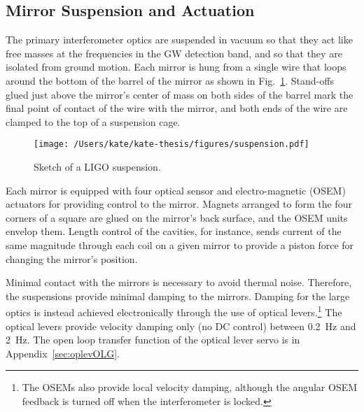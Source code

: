 \subsection{Mirror Suspension and Actuation}
\label{sec:suspension}
The primary interferometer optics are suspended in vacuum so that they
act like free masses at the frequencies in the GW detection band, and
so that they are isolated from ground motion. Each mirror is hung from
a single wire that loops around the bottom of the barrel of the mirror
as shown in Fig.~\ref{fig:suspension}. Stand-offs glued just above the
mirror's center of mass on both sides of the barrel mark the final
point of contact of the wire with the mirror, and both ends of the
wire are clamped to the top of a suspension cage.

\begin{figure}
\begin{centering}
\texttt{[image: /Users/kate/kate-thesis/figures/suspension.pdf]}
\caption[Sketch of a LIGO suspension]{Sketch of a LIGO suspension.}
\label{fig:suspension}
\end{centering}
\end{figure}

Each mirror is equipped with four optical sensor and electro-magnetic
(OSEM) actuators for providing control to the mirror. Magnets arranged
to form the four corners of a square are glued on the mirror's back
surface, and the OSEM units envelop them. Length control of the
cavities, for instance, sends current of the same magnitude through
each coil on a given mirror to provide a piston force for changing the
mirror's position.

Minimal contact with the mirrors is necessary to avoid thermal
noise. Therefore, the suspensions provide minimal damping to the
mirrors. Damping for the large optics is instead achieved
electronically through the use of optical levers.\footnote{The OSEMs
  also provide local velocity damping, although the angular OSEM
  feedback is turned off when the interferometer is locked.} The
optical levers provide velocity damping only (no DC control) between
0.2~Hz and 2~Hz. The open loop transfer function of the optical lever
servo is in Appendix~\ref{sec:oplevOLG}.

